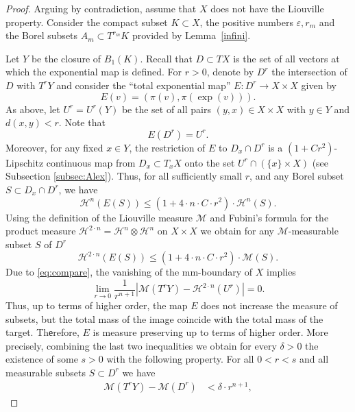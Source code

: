 \documentclass[12pt,leqno,intlimits]{amsart}
\numberwithin{equation}{section}
\theoremstyle{definition}
\theoremstyle{remark}
\newcommand{\lref}[1]{Lemma~\ref{#1}}
\def\:{\colon}
\begin{document}
\begin{proof}
Arguing by contradiction, assume that $X$ does not have the Liouville property. 
Consider the compact subset $K \subset X$, the positive numbers $\varepsilon, r_m$ and the Borel
subsets $A_m\subset T^{r_m} K$ provided by \lref{infini}.

Let $Y$ be the closure of $B_1 (K)$.
Recall that $D\subset TX$ is the set of all vectors at which the exponential map is defined.
For $r>0$, denote by $D^r$ the intersection of $D$ with $T^r Y$ and consider the ``total exponential map''
$E\:D^r \to X\times X$ given by 
$$E(v)= (\pi (v), \pi (\exp (v))).$$
As above, let $U^r =U^r(Y)$ be the set of all
pairs $(y,x) \in X\times X$ with $y\in Y$ and $d(x,y)<r$.
Note that
\begin{equation} \label{eq:image}
E(D^r) =U^r.
\end{equation}
Moreover, for any fixed $x \in Y$, the restriction of $E$ to $D_x \cap D^r$ is
a $(1+ C r^2)$-Lipschitz continuous map from $D_x\subset T_xX$ onto the set $U^r \cap (\{x \} \times X)$ (see Subsection \ref{subsec:Alex}).
Thus, for all sufficiently small $r$, and any Borel subset $S\subset D_x \cap D^r$, we have
$$\mathcal H^n (E(S)) \leq (1+4{\cdot} n{\cdot}  C{\cdot}  r^2)\cdot \mathcal H^n (S).$$
Using the definition of the Liouville measure $\mathcal M$ and Fubini's formula for the product measure
$\mathcal H^{2\cdot n} =\mathcal H^n \otimes \mathcal H^n $ on $X\times X$ we obtain for any $\mathcal M$-measurable subset $S$ of $D^r$
\begin{equation} \label{eq:contract}
\mathcal H^{2\cdot n} (E(S)) \leq (1+4{\cdot} n{\cdot} C{\cdot}  r^2) \cdot \mathcal M(S).
\end{equation}
Due to \eqref{eq:compare}, the vanishing  of the mm-boundary of $X$ implies
$$\lim _{r\to 0} \frac 1 {r^{n+1} } |\mathcal M(T^{r} Y) -\mathcal H^{2\cdot n} (U^r)| =0.$$
Thus, up to terms of higher order, the map $E$ does not increase the measure of subsets, but the total mass of the image
coincide with the total mass of the target.
Thеrefore, $E$ is measure preserving up to terms of higher order.
More precisely, combining the last two inequalities we obtain for every $\delta >0$ the existence of some $s>0$ with the following property. For all $0<r<s$ and all measurable subsets $S\subset D^r$
we have
\begin{equation} \label{eq:almostall}
\begin{aligned}
 \mathcal M (T^r Y)- \mathcal M (D^r) &< \delta{\cdot}r^{n+1},

\end{aligned}
\end{equation}
\end{proof}
\end{document}
